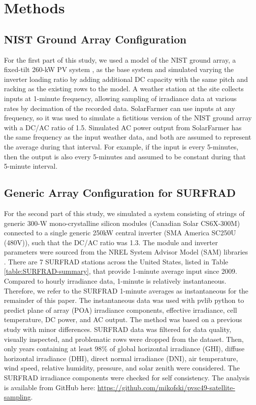 \documentclass[conference]{IEEEtran}
\begin{document}
\section{Methods}

\subsection{NIST Ground Array Configuration}
For the first part of this study, we used a model of the NIST ground array, a fixed-tilt 260-kW PV system \cite{Boyd2017,Boyd2017a,Boyd2017b}, as the base system and simulated varying the inverter loading ratio by adding additional DC capacity with the same pitch and racking as the existing rows to the model. A weather station at the site collects inputs at 1-minute frequency, allowing sampling of irradiance data at various rates by decimation of the recorded data. SolarFarmer \cite{solarfarmer2018} can use inputs at any frequency, so it was used to simulate a fictitious version of the NIST ground array with a DC/AC ratio of 1.5. Simulated AC power output from SolarFarmer has the same frequency as the input weather data, and both are assumed to represent the average during that interval. For example, if the input is every 5-minutes, then the output is also every 5-minutes and assumed to be constant during that 5-minute interval.

\subsection{Generic Array Configuration for SURFRAD}
For the second part of this study, we simulated a system consisting of strings of generic 300-W mono-crystalline silicon modules (Canadian Solar CS6X-300M) connected to a single generic 250kW central inverter (SMA America SC250U (480V)), such that the DC/AC ratio was 1.3. The module and inverter parameters were sourced from the NREL System Advisor Model (SAM) libraries \cite{Freeman2018}. There are 7 SURFRAD \cite{Augustine2000} stations across the United States, listed in Table \ref{table:SURFRAD-summary}, that provide 1-minute average input since 2009. Compared to hourly irradiance data, 1-minute is relatively instantaneous. Therefore, we refer to the SURFRAD 1-minute averages as instantaneous for the remainder of this paper. The instantaneous data was used with pvlib python \cite{pvlib2018} to predict plane of array (POA) irradiance components, effective irradiance, cell temperature, DC power, and AC output. The method was based on a previous study \cite{9519024} with minor differences. SURFRAD data was filtered for data quality, visually inspected, and problematic rows were dropped from the dataset. Then, only years containing at least 98\% of global horizontal irradiance (GHI), diffuse horizontal irradiance (DHI), direct normal irradiance (DNI), air temperature, wind speed, relative humidity, pressure, and solar zenith were considered. The SURFRAD irradiance components were checked for self consistency. The analysis is available from GitHub here: \url{https://github.com/mikofski/pvsc49-satellite-sampling}.
\end{document}

